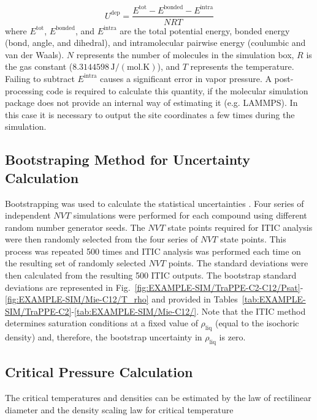 \documentclass[5p,times]{elsarticle}
\begin{document}
\begin{equation}
U^{\mathrm{dep}} = \frac{E^{\mathrm{tot}} - E^{\mathrm{bonded}} - E^{\mathrm{intra}}}{NRT}\label{eqn:uDepForm}
\end{equation}
where $E^{\mathrm{tot}}$, $E^{\mathrm{bonded}}$, and $E^{\mathrm{intra}}$ are the total potential energy, bonded energy (bond, angle, and dihedral), and intramolecular pairwise energy (coulumbic and van der Waals). $N$ represents the number of molecules in the simulation box, $R$ is the gas constant ($8.3144598\,\mathrm{J/(mol.K)}$), and $T$ represents the temperature. Failing to subtract $E^{\mathrm{intra}}$ causes a significant error in vapor pressure. A post-processing code is required to calculate this quantity, if the molecular simulation package does not provide an internal way of estimating it (e.g. LAMMPS). In this case it is necessary to output the site coordinates a few times during the simulation.

\subsection{Bootstraping Method for Uncertainty Calculation}\label{sec:bootstrapping}
Bootstrapping was used to calculate the statistical uncertainties \cite{Efron1981}. Four series of independent $NVT$ simulations were performed for each compound using different random number generator seeds. The $NVT$ state points required for ITIC analysis were then randomly selected from the four series of $NVT$ state points. This process was repeated 500 times and ITIC analysis was performed each time on the resulting set of randomly selected $NVT$ points. The standard deviations were then calculated from the resulting 500 ITIC outputs. 
The bootstrap standard deviations are represented in Fig.~\ref{fig:EXAMPLE-SIM/TraPPE-C2-C12/Psat}-\ref{fig:EXAMPLE-SIM/Mie-C12/T_rho} and provided in Tables~\ref{tab:EXAMPLE-SIM/TraPPE-C2}-\ref{tab:EXAMPLE-SIM/Mie-C12/}. 
Note that the ITIC method determines saturation conditions at a fixed value of $\rho_{\mathrm{liq}}$ (equal to the isochoric density) and, therefore, the bootstrap uncertainty in $\rho_{\mathrm{liq}}$ is zero.

\subsection{Critical Pressure Calculation}\label{sec:PcCalc}
The critical temperatures and densities can be estimated by the law of rectilinear diameter \cite{Rowlinson1982} and the density scaling law \cite{Rowlinson2013} for critical temperature
\end{document}
